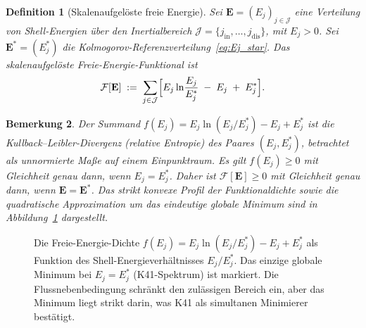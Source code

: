 \documentclass[12pt,a4paper]{article}
\theoremstyle{breakdef}
\newtheorem{definition}{Definition}[section]
\theoremstyle{breakplain}
\theoremstyle{breakdef}
\newtheorem{remark}[definition]{Bemerkung}
\begin{document}
\begin{definition}[Skalenaufgelöste freie Energie]\label{def:F}
Sei $\mathbf{E} = (E_j)_{j \in \mathcal{J}}$ eine Verteilung von
Shell-Energien über den Inertialbereich $\mathcal{J} = \{j_{\mathrm{in}}, \dots,
j_{\mathrm{dis}}\}$, mit $E_j > 0$. Sei $\mathbf{E}^* = (E_j^*)$ die
Kolmogorov-Referenzverteilung~\eqref{eq:Ej_star}. Das
\emph{skalenaufgelöste Freie-Energie-Funktional} ist
\begin{equation}\label{eq:F}
  \mathcal{F}[\mathbf{E}]
  \;:=\;
  \sum_{j \in \mathcal{J}}
  \Bigl[
    E_j \ln\!\frac{E_j}{E_j^*} \;-\; E_j \;+\; E_j^*
  \Bigr].
\end{equation}
\end{definition}

\begin{remark}
Der Summand $f(E_j) = E_j \ln(E_j/E_j^*) - E_j + E_j^*$ ist die
Kullback--Leibler-Divergenz (relative Entropie) des Paares $(E_j, E_j^*)$,
betrachtet als unnormierte Maße auf einem Einpunktraum. Es gilt
$f(E_j) \ge 0$ mit Gleichheit genau dann, wenn $E_j = E_j^*$. Daher ist
$\mathcal{F}[\mathbf{E}] \ge 0$ mit Gleichheit genau dann, wenn $\mathbf{E} = \mathbf{E}^*$. Das strikt konvexe Profil der Funktionaldichte sowie die quadratische Approximation um das eindeutige globale Minimum sind in Abbildung~\ref{fig:FE-landscape} dargestellt.
\end{remark}

\begin{figure}[ht]
\centering
{}
\caption{Die Freie-Energie-Dichte $f(E_j) = E_j \ln(E_j / E_j^*) - E_j + E_j^*$
als Funktion des Shell-Energieverhältnisses $E_j / E_j^*$. Das einzige globale
Minimum bei $E_j = E_j^*$ (K41-Spektrum) ist markiert. Die Flussnebenbedingung
schränkt den zulässigen Bereich ein, aber das Minimum liegt strikt darin, was
K41 als simultanen Minimierer bestätigt.}
\label{fig:FE-landscape}
\end{figure}
\end{document}
